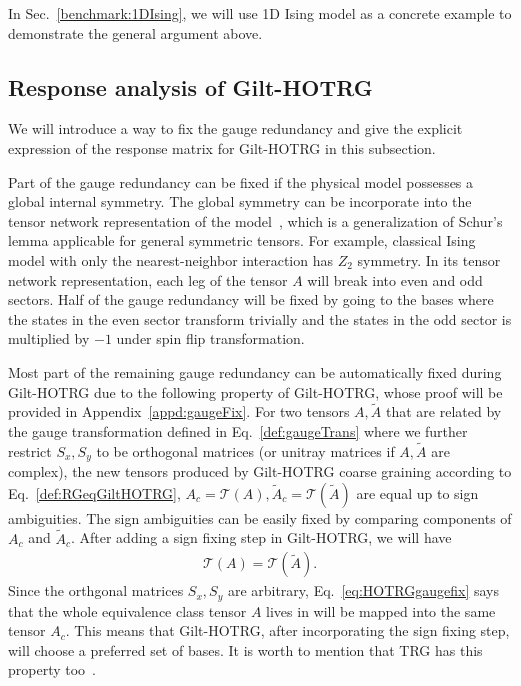 \documentclass[aps,prb,reprint,superscriptaddress]{revtex4-2}
\begin{document}
In Sec.~\ref{benchmark:1DIsing}, we will use 1D Ising model as a
concrete example to demonstrate the general argument above.
%

\subsection{Response analysis of Gilt-HOTRG\label{RespAnaGiltHOTRG}}
We will introduce a way to fix the gauge redundancy and give the
explicit expression of the response matrix for Gilt-HOTRG in this
subsection.
%

Part of the gauge redundancy can be fixed if the physical model
possesses a global internal symmetry. The global symmetry can be
incorporate into the tensor network representation of the
model~\cite{Singh2010SymTen,Singh2011U1Ten,Singh2012SU2Ten}, which is a
generalization of Schur's lemma applicable for general symmetric
tensors. For example, classical Ising model with only the
nearest-neighbor interaction has $Z_2$ symmetry. In its tensor
network representation, each leg of the tensor $A$ will break into even
and odd sectors. Half of the gauge redundancy will be fixed by going to
the bases where the states in the even sector transform trivially and
the states in the odd sector is multiplied by $-1$ under spin flip
transformation.
%

Most part of the remaining gauge redundancy can be automatically fixed
during Gilt-HOTRG due to the following property of Gilt-HOTRG, whose
proof will be provided in Appendix~\ref{appd:gaugeFix}. For two tensors
$A, \tilde{A}$ that are related by the gauge transformation defined in
Eq.~\eqref{def:gaugeTrans} where we further restrict $S_x,S_y$ to be
orthogonal matrices (or unitray matrices if $A, \tilde{A}$ are complex),
the new tensors produced by Gilt-HOTRG coarse graining according to
Eq.~\eqref{def:RGeqGiltHOTRG}, $A_c = \mathcal{T}\left(A\right),
\tilde{A}_c = \mathcal{T}(\tilde{A})$ are equal up to sign ambiguities.
The sign ambiguities can be easily fixed by comparing components of
$A_c$ and $\tilde{A}_c$. After adding a sign fixing step in Gilt-HOTRG,
we will have
%
\begin{align}\label{eq:HOTRGgaugefix}
    \mathcal{T}(A) = \mathcal{T}(\tilde{A}).
\end{align}
%
Since the orthgonal matrices $S_x, S_y$ are arbitrary,
Eq.~\eqref{eq:HOTRGgaugefix} says that the whole equivalence class tensor
$A$ lives in will be mapped into the same tensor $A_c$. This means
that Gilt-HOTRG, after incorporating the sign fixing step, will choose a
preferred set of bases. It is worth to mention that TRG has this
property too~\cite{kadanoff2014}.
%
\end{document}
